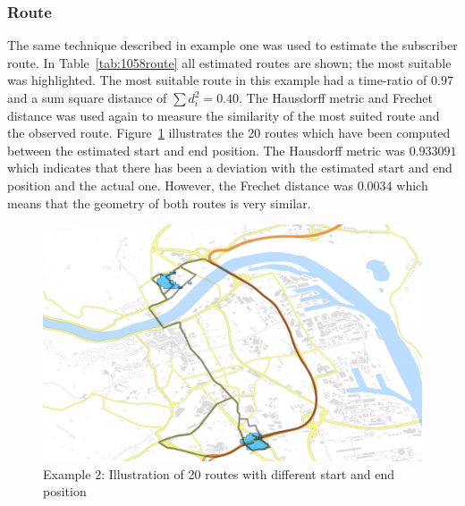\documentclass[master,english]{hgbthesis}
\begin{document}
\subsubsection{Route}
The same technique described in example one was used to estimate the subscriber route. In Table~\ref{tab:1058route} all estimated routes are shown; the most suitable was highlighted. The most suitable route in this example  had a time-ratio of  $0.97$ and a sum square distance of $\sum {d}_{i}^{2}=0.40$. The Hausdorff metric and Frechet distance was used again to measure the similarity of the most suited route and the observed route. Figure~\ref{fig:1058_routes} illustrates the 20 routes which have been computed between the estimated start and end position. The Hausdorff metric was $0.933091$ which indicates that there has been a deviation with the estimated start and end position and the actual one. However, the Frechet distance was  $0.0034$ which means that the geometry of both routes is very similar.
\begin{figure}
\centering
\includegraphics[width=0.7\linewidth]{./images/1058_routes}
\caption{Example 2: Illustration of 20 routes with different start and end position}
\label{fig:1058_routes}
\end{figure}
\end{document}
